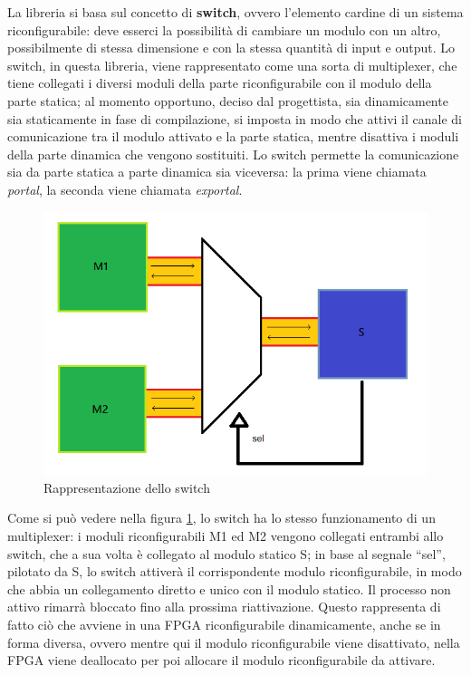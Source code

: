 \documentclass[a4paper,titlepage]{book}
\begin{document}
La libreria si basa sul concetto di \textbf{switch}, ovvero l'elemento cardine di un sistema riconfigurabile: deve esserci la possibilità di cambiare un modulo con un altro, possibilmente di stessa dimensione e con la stessa quantità di input e output. Lo switch, in questa libreria, viene rappresentato come una sorta di multiplexer, che tiene collegati i diversi moduli della parte riconfigurabile con il modulo della parte statica; al momento opportuno, deciso dal progettista, sia dinamicamente sia staticamente in fase di compilazione, si imposta in modo che attivi il canale di comunicazione tra il modulo attivato e la parte statica, mentre disattiva i moduli della parte dinamica che vengono sostituiti. Lo switch permette la comunicazione sia da parte statica a parte dinamica sia viceversa: la prima viene chiamata \textit{portal}, la seconda viene chiamata \textit{exportal}.

\begin{figure}[ht]
\centering
\includegraphics[scale=0.5]{portal.png}
\caption{Rappresentazione dello switch}\label{fig:3}
\end{figure}

Come si può vedere nella figura \ref{fig:3}, lo switch ha lo stesso funzionamento di un multiplexer: i moduli riconfigurabili M1 ed M2 vengono collegati entrambi allo switch, che a sua volta è collegato al modulo statico S; in base al segnale ``sel'', pilotato da S, lo switch attiverà il corrispondente modulo riconfigurabile, in modo che abbia un collegamento diretto e unico con il modulo statico. Il processo non attivo rimarrà bloccato fino alla prossima riattivazione. Questo rappresenta di fatto ciò che avviene in una FPGA riconfigurabile dinamicamente, anche se in forma diversa, ovvero mentre qui il modulo riconfigurabile viene disattivato, nella FPGA viene deallocato per poi allocare il modulo riconfigurabile da attivare.
\end{document}
